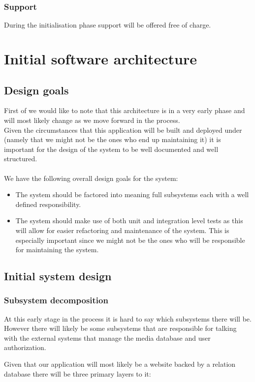 \documentclass[12pt]{article}
\begin{document}
\subsubsection{Support}
During the initialisation phase support will be offered free of charge.
\section{Initial software architecture}
\subsection{Design goals}
First of we would like to note that this architecture is in a very early phase
and will most likely change as we move forward in the process.\\
Given the circumstances that this application will be built and deployed under (namely that we might not be the ones who end up maintaining it) it is important for the design of the system to be well documented and well structured.\\\\
We have the following overall design goals for the system:
\begin{itemize}
  \item The system should be factored into meaning full subsystems each with a well defined responsibility.
  \item The system should make use of both unit and integration level tests as this will allow for easier refactoring and maintenance of the system. This is especially important since we might not be the ones who will be responsible for maintaining the system.
\end{itemize}
\subsection{Initial system design}
\subsubsection{Subsystem decomposition}
At this early stage in the process it is hard to say which subsystems there will be. However there will likely be some subsystems that are responsible for talking with the external systems that manage the media database and user authorization.

Given that our application will most likely be a website backed by a relation database there will be three primary layers to it:
\end{document}
